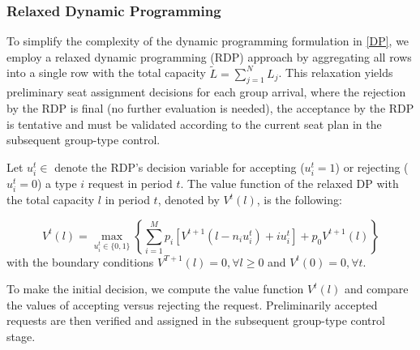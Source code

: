 
\subsubsection{Relaxed Dynamic Programming}
To simplify the complexity of the dynamic programming formulation in \eqref{DP}, we employ a relaxed dynamic programming (RDP) approach by aggregating all rows into a single row with the total capacity $\tilde{L} = \sum_{j=1}^{N} L_j$. This relaxation yields preliminary seat assignment decisions for each group arrival, where the rejection by the RDP is final (no further evaluation is needed), the acceptance by the RDP is tentative and must be validated according to the current seat plan in the subsequent group-type control.

Let $u_{i}^{t} \in $ denote the RDP's decision variable for accepting ($u_{i}^{t} = 1$) or rejecting ($u_{i}^{t} = 0$) a type $i$ request in period $t$. The value function of the relaxed DP with the total capacity $l$ in period $t$, denoted by $V^{t}(l)$, is the following:

\begin{equation}\label{DP_relaxed}
V^{t}(l) =  \max_{u_{i}^{t} \in \{0,1\}} \left\{ \sum_{i=1}^{M} p_i \left[V^{t+1}(l-n_i u_{i}^{t})+ i u_{i}^{t}\right] + p_0 V^{t+1}(l)\right\}
\end{equation}
with the boundary conditions $V^{T+1}(l) =0, \forall l \geq 0$ and $V^{t}(0) =0, \forall t$.


To make the initial decision, we compute the value function $V^{t}(l)$ and compare the values of accepting versus rejecting the request. Preliminarily accepted requests are then verified and assigned in the subsequent group-type control stage.






